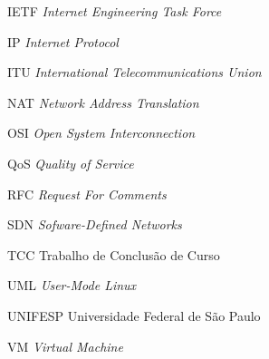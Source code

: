 \documentclass[	12pt, Times, openright, twoside, a4paper, english, brazil]{abntex2}
\begin{document}
\begin{siglas}
  \item[IETF] \textit{Internet Engineering Task Force}
  \item[IP] \textit{Internet Protocol}
  \item[ITU] \textit{International Telecommunications Union}
  \item[NAT] \textit{Network Address Translation}
  \item[OSI] \textit{Open System Interconnection}
  \item[QoS] \textit{Quality of Service}
  \item[RFC] \textit{Request For Comments}
  \item[SDN] \textit{Sofware-Defined Networks}
  \item[TCC] Trabalho de Conclusão de Curso
  \item[UML] \textit{User-Mode Linux}
  \item[UNIFESP] Universidade Federal de São Paulo
  \item[VM] \textit{Virtual Machine}
\end{siglas}

\tableofcontents*
\cleardoublepage

\textual

\end{document}

